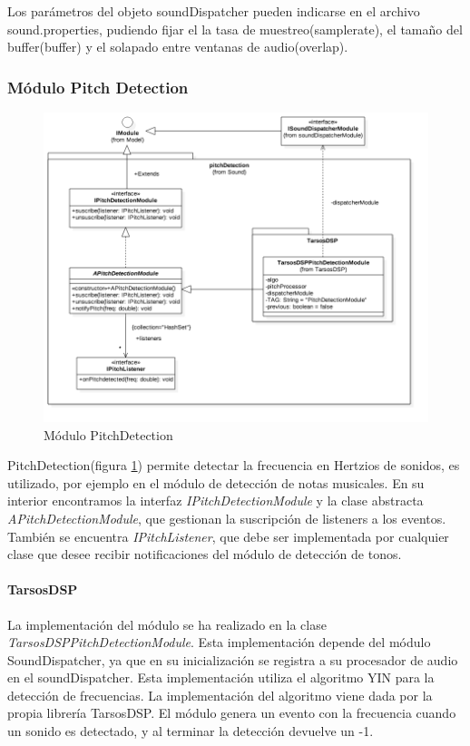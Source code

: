 Los parámetros del objeto soundDispatcher pueden indicarse en el archivo sound.properties, pudiendo fijar el la tasa de muestreo(samplerate), el tamaño del buffer(buffer) y el solapado entre ventanas de audio(overlap).

\subsubsection{Módulo Pitch Detection}
\begin{figure}
	\centering
	\includegraphics[width=1\linewidth]{imagenes/diagramas/PitchDetectionModule.png}
	\caption{Módulo PitchDetection}
	\label{fig:pitch-detection-module}
\end{figure}
PitchDetection(figura \ref{fig:pitch-detection-module}) permite detectar la frecuencia en Hertzios de sonidos, es utilizado, por ejemplo en el módulo de detección de notas musicales.
En su interior encontramos la interfaz \textit{IPitchDetectionModule} y la clase abstracta \textit{APitchDetectionModule}, que gestionan la suscripción de listeners a los eventos. También se encuentra \textit{IPitchListener}, que debe ser implementada por cualquier clase que desee recibir notificaciones del módulo de detección de tonos.

\paragraph*{TarsosDSP \\}
La implementación del módulo se ha realizado en la clase \textit{TarsosDSPPitchDetectionModule}. Esta implementación depende del módulo SoundDispatcher, ya que en su inicialización se registra a su procesador de audio en el soundDispatcher.
Esta implementación utiliza el algoritmo YIN \cite{de_YINa_f2002} para la detección de frecuencias. La implementación del algoritmo viene dada por la propia librería TarsosDSP. El módulo genera un evento con la frecuencia cuando un sonido es detectado, y al terminar la detección devuelve un -1.


